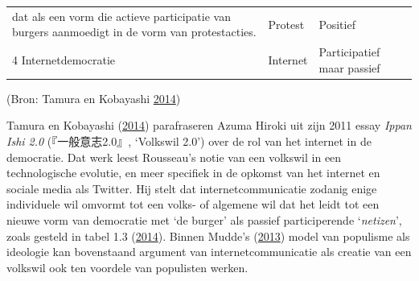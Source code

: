 \documentclass[10.5pt,dutch,]{article}
\begin{document}
\begin{longtable}[]{@{}lll@{}}
{  dat als een vorm die actieve participatie van burgers aanmoedigt in de
  vorm van protestacties.} &
\begin{minipage}[t]{0.38\columnwidth}\raggedright\strut
Protest
\strut\end{minipage} &
\begin{minipage}[t]{0.21\columnwidth}\raggedright\strut
Positief
\strut\end{minipage}\tabularnewline
\begin{minipage}[t]{0.32\columnwidth}\raggedright\strut
4 Internetdemocratie
\strut\end{minipage} &
\begin{minipage}[t]{0.38\columnwidth}\raggedright\strut
Internet
\strut\end{minipage} &
\begin{minipage}[t]{0.21\columnwidth}\raggedright\strut
Participatief maar passief
\strut\end{minipage}\tabularnewline
\bottomrule
\end{longtable}

(Bron: Tamura en Kobayashi
\protect\hyperlink{ref-tamuraux5fnigglingux5f2014}{2014})

Tamura en Kobayashi
(\protect\hyperlink{ref-tamuraux5fnigglingux5f2014}{2014}) parafraseren
Azuma Hiroki uit zijn 2011 essay \emph{Ippan Ishi 2.0} (『一般意志2.0』,
`Volkswil 2.0') over de rol van het internet in de democratie. Dat werk
leest Rousseau's notie van een volkswil in een technologische evolutie,
en meer specifiek in de opkomst van het internet en sociale media als
Twitter. Hij stelt dat internetcommunicatie zodanig enige individuele
wil omvormt tot een volks- of algemene wil dat het leidt tot een nieuwe
vorm van democratie met `de burger' als passief participerende
`\emph{netizen}', zoals gesteld in tabel 1.3
(\protect\hyperlink{ref-tamuraux5fnigglingux5f2014}{2014}). Binnen
Mudde's (\protect\hyperlink{ref-muddeux5foxfordux5f2013}{2013}) model
van populisme als ideologie kan bovenstaand argument van
internetcommunicatie als creatie van een volkswil ook ten voordele van
populisten werken.
\end{document}
